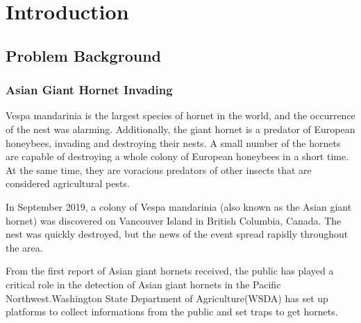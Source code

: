 \documentclass[12pt]{article}
\begin{document}
\clearpage
\pagestyle{fancy}
\tableofcontents 
\newpage
\setcounter{page}{1}


\section{Introduction}
\subsection{Problem Background}
\subsubsection{Asian Giant Hornet Invading  }
Vespa mandarinia is the largest species of hornet in the world, and the occurrence of the nest was 
alarming. Additionally, the giant hornet is a predator of European honeybees, invading and 
destroying their nests. A small number of the hornets are capable of destroying a whole colony 
of European honeybees in a short time. At the same time, they are voracious predators of other 
insects that are considered agricultural pests.

In September 2019, a colony of Vespa mandarinia (also known as the Asian giant hornet) was 
discovered on Vancouver Island in British Columbia, Canada. The nest was quickly destroyed, 
but the news of the event spread rapidly throughout the area. 

From the first report of Asian giant hornets received, the public has played a critical role in the detection of Asian giant hornets in the Pacific Northwest.Washington State Department of Agriculture(WSDA)  has set up platforms\cite{fb} to collect informations from the  public and set traps to get hornets.  
 
\end{document}
